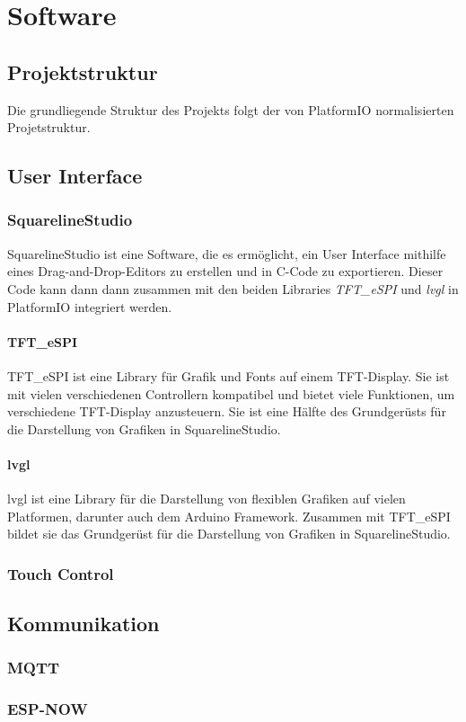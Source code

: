 \chapter{Software}

    \section{Projektstruktur}
    Die grundliegende Struktur des Projekts folgt der von PlatformIO 
    normalisierten Projetstruktur. 

    \section{User Interface}
        \subsection{SquarelineStudio}
        SquarelineStudio ist eine Software, die es ermöglicht, ein 
        User Interface mithilfe eines Drag-and-Drop-Editors zu erstellen und
        in C-Code zu exportieren. Dieser Code kann dann dann zusammen mit den 
        beiden Libraries \textit{TFT\_eSPI} und \textit{lvgl} in PlatformIO
        integriert werden.

            \subsubsection{TFT\_eSPI}
            TFT\_eSPI ist eine Library für Grafik und Fonts auf einem TFT-Display.
            Sie ist mit vielen verschiedenen Controllern kompatibel und bietet
            viele Funktionen, um verschiedene TFT-Display anzusteuern.
            Sie ist eine Hälfte des Grundgerüsts für die Darstellung von Grafiken 
            in SquarelineStudio.

            \subsubsection{lvgl}
            lvgl ist eine Library für die Darstellung von flexiblen Grafiken
            auf vielen Platformen, darunter auch dem Arduino Framework.
            Zusammen mit TFT\_eSPI bildet sie das Grundgerüst für die Darstellung
            von Grafiken in SquarelineStudio.
        \subsection{Touch Control}

    \section{Kommunikation}
        \subsection{MQTT}
        \subsection{ESP-NOW}

